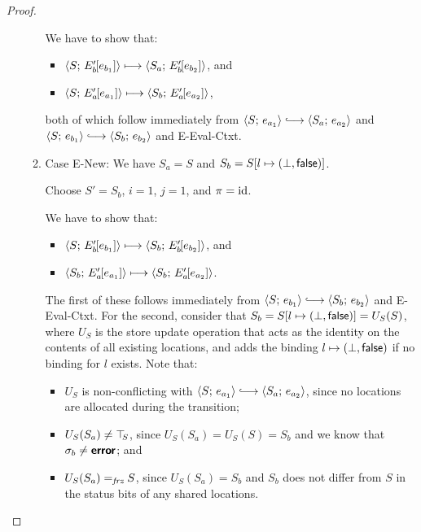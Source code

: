 \begin{proof}
\begin{enumerate}
\begin{enumerate}
      We have to show that:
      \begin{itemize}
      \item $\langle S;\, E'_b\hspace{-1mm}\left[e_{b_1}\right] \rangle \longmapsto
        \langle S_a;\, E'_b\hspace{-1mm}\left[e_{b_2}\right] \rangle$, and
      \item $\langle S;\, E'_a\hspace{-1mm}\left[e_{a_1}\right] \rangle \longmapsto
        \langle S_b;\, E'_a\hspace{-1mm}\left[e_{a_2}\right] \rangle$, 
      \end{itemize}

      both of which follow immediately from $\config{S}{e_{a_1}}
      \parstepsto \config{S_a}{e_{a_2}}$ and $\config{S}{e_{b_1}}
      \parstepsto \config{S_b}{e_{b_2}}$ and {\sc E-Eval-Ctxt}.

    \item \label{slqc-beta-new}Case {\sc E-New}: We have $S_a = S$ and
      $S_b = S[l \mapsto (\bot, \textsf{false})]$.

      Choose $S' = S_b$, $i = 1$, $j = 1$, and $\pi = \mathrm{id}$.

      We have to show that:
      \begin{itemize}
      \item $\langle S;\, E'_b\hspace{-1mm}\left[e_{b_1}\right] \rangle \longmapsto
        \langle S_b;\, E'_b\hspace{-1mm}\left[e_{b_2}\right] \rangle$, and
      \item
        $\langle S_b;\, E'_a\hspace{-1mm}\left[e_{a_1}\right] \rangle \longmapsto
        \langle S_b;\, E'_a\hspace{-1mm}\left[e_{a_2}\right] \rangle$.
      \end{itemize}

      The first of these follows immediately from $\config{S}{e_{b_1}}
      \parstepsto \config{S_b}{e_{b_2}}$ and {\sc E-Eval-Ctxt}.  For
      the second, consider that $S_b = S[l \mapsto (\bot, \textsf{false})]
      = U_S(S)$, where $U_S$ is the store update operation that acts
      as the identity on the contents of all existing locations, and
      adds the binding $l \mapsto (\bot, \textsf{false})$ if no
      binding for $l$ exists.  Note that:
      \begin{itemize}
      \item $U_S$ is non-conflicting with $\config{S}{e_{a_1}}
        \parstepsto \config{S_a}{e_{a_2}}$, since no locations are
        allocated during the transition;
        \item $U_S(S_a) \neq \top\hspace{-0.85mm}_{S}$, since $U_S(S_a) = U_S(S) = S_b$
          and we know that $\sigma_b \neq \textbf{\textsf{error}}$; and
        \item $U_S(S_a) =_{\textit{frz}} S$, since $U_S(S_a) = S_b$ and $S_b$
          does not differ from $S$ in the status bits of any shared
          locations.
      \end{itemize}


\end{enumerate}
\end{enumerate}
\end{proof}
